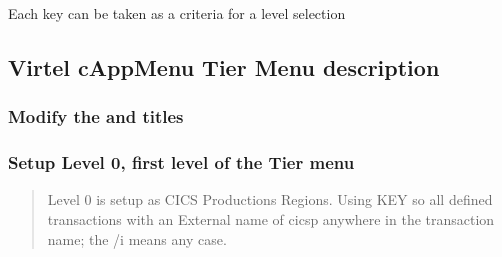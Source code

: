 \documentclass[letterpaper,10pt,english]{sphinxmanual}
\begin{document}
\begin{sphinxVerbatim}[commandchars=\\\{\}]
   
   
   
   
\end{sphinxVerbatim}

\sphinxAtStartPar
Each key can be taken as a criteria for a level selection


\subsection{Virtel cAppMenu Tier Menu description}
\label{\detokenize{Customization:virtel-cappmenu-tier-menu-description}}
\sphinxAtStartPar
{}


\subsubsection{Modify the  and  titles}
\label{\detokenize{Customization:modify-the-main-and-sub-titles}}
\begin{sphinxVerbatim}[commandchars=\\\{\}]
   

\PYG{p}{[}\PYG{p}{]}  
\end{sphinxVerbatim}


\subsubsection{Setup Level 0, first level of the Tier menu \sphinxhyphen{} }
\label{\detokenize{Customization:setup-level-0-first-level-of-the-tier-menu-cics-production-regions}}\begin{quote}

\sphinxAtStartPar
Level 0 is setup as CICS Productions Regions. Using KEY  so all defined transactions with an External name of cicsp anywhere in the transaction name; the /i means any case.
\end{quote}
\end{document}
